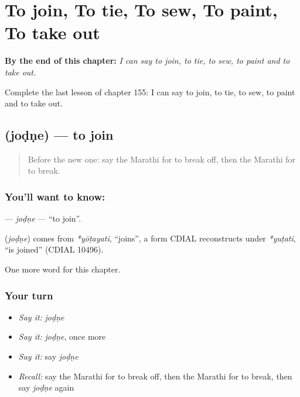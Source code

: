
\chapter{To join, To tie, To sew, To paint, To take out}
\label{ch:mr-to-join-to-tie-to-sew-to-paint-to-take-out}

\begin{chapteropening}
\textbf{By the end of this chapter:} \emph{I can say to join, to tie, to sew, to paint and to take out.}

Complete the last lesson of chapter 155: I can say to join, to tie, to sew, to paint and to take out.
\end{chapteropening}

\section[\texorpdfstring{\mr{जोडणे} (joḍṇe)}{जोडणे (joḍṇe)}]{ (joḍṇe) — to join}

\label{lesson:MR-C155-jodne}



\begin{quote}
Before the new one: say the Marathi for to break off, then the Marathi for to break.
\end{quote}

\subsection*{You'll want to know: }
\textbf{} — \emph{joḍṇe} — \textquotedblleft{}to join\textquotedblright{}.

\begin{cousinweb}
\textbf{} (\emph{joḍṇe}) comes from \emph{*yōṭayati}, \textquotedblleft{}joins\textquotedblright{}, a form CDIAL reconstructs under \emph{*yuṭati}, \textquotedblleft{}is joined\textquotedblright{} (CDIAL 10496).
\end{cousinweb}

\begin{grammarlens}[title={What you've built}]
One more word for this chapter.
\end{grammarlens}

\subsection*{Your turn}
\begin{itemize}
\raggedright
  \item \emph{Say it:} \emph{joḍṇe}
  \item \emph{Say it:} \emph{joḍṇe}, once more
  \item \emph{Say it:} say \emph{joḍṇe}
  \item \emph{Recall:} say the Marathi for to break off, then the Marathi for to break, then say \emph{joḍṇe} again
\end{itemize}

